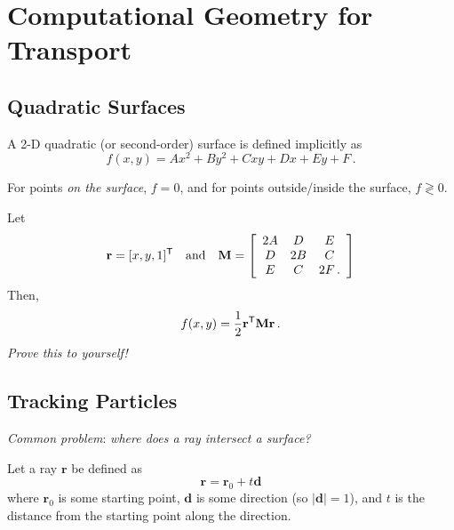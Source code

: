 \chapter{Computational Geometry for Transport}
\label{app:computational_geometry}

\section*{Quadratic Surfaces}

A 2-D quadratic (or second-order) surface is defined 
implicitly as
\begin{equation}
 f(x, y) = A x^2 + B y^2 + C xy + Dx + Ey + F \, .
\end{equation}
 
For points \emph{on the surface}, $f=0$, and for points outside/inside the 
surface, $f \gtrless 0$.
 
Let 
\begin{equation*}
 \mathbf{r} = [x, y, 1]^{\mathsf{T}} 
 \quad \text{and} \quad
 \mathbf{M} =
 \left [ 
 \begin{array}{ccc}
  2 A &   D  &   E   \\
    D & 2 B  &   C   \\
    E &   C  & 2 F   \, .
 \end{array}
 \right ]  
\end{equation*}
Then,
\begin{equation}
 f(x, y) = \frac{1}{2} \mathbf{r}^{\mathsf{T}} \mathbf{M} \mathbf{r} \, .
\label{eq:quadratic_residual}
\end{equation}
\emph{ Prove this to yourself!}

\section*{Tracking Particles}


\emph{ Common problem}: \emph{where does a ray intersect a surface?}

Let a ray $\mathbf{r}$ be defined as 
\begin{equation}
 \mathbf{r} = \mathbf{r}_0 + t \mathbf{d}
\end{equation}
where $\mathbf{r}_0$ is some starting point, $\mathbf{d}$ is some 
direction (so $|\mathbf{d}|=1$), and $t$ is the distance from 
the starting point along the direction.

